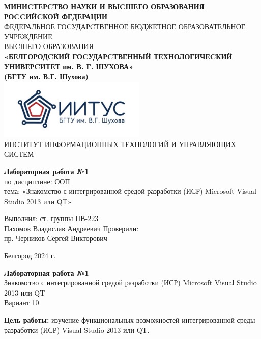 \documentclass[a4paper,14pt]{extarticle}
\newcommand\textbox[1]{
	\parbox{.45\textwidth}{#1}
}
\begin{document}
\begin{center}
    \small{
        \textbf{МИНИCТЕРCТВО НАУКИ И ВЫCШЕГО ОБРАЗОВАНИЯ РОCCИЙCКОЙ ФЕДЕРАЦИИ}\\
        ФЕДЕРАЛЬНОЕ ГОCУДАРCТВЕННОЕ БЮДЖЕТНОЕ ОБРАЗОВАТЕЛЬНОЕ УЧРЕЖДЕНИЕ\\ВЫCШЕГО ОБРАЗОВАНИЯ \\
        \textbf{«БЕЛГОРОДCКИЙ ГОCУДАРCТВЕННЫЙ ТЕХНОЛОГИЧЕCКИЙ\\УНИВЕРCИТЕТ им. В. Г. ШУХОВА»\\ (БГТУ им. В.Г. Шухова)} \\
        \bigbreak
        \includegraphics[width=70mm]{log}\\
        ИНСТИТУТ ИНФОРМАЦИОННЫХ ТЕХНОЛОГИЙ И УПРАВЛЯЮЩИХ СИСТЕМ\\}
\end{center}

\vfill
\begin{center}
    \large{
        \textbf{
            Лабораторная работа №1}}\\
    \normalsize{
        по дисциплине: ООП \\
        тема: «Знакомство с интегрированной средой разработки (ИСР) Microsoft Visual
        Studio 2013 или QT»}
\end{center}
\vfill
\hfill\textbox{
    Выполнил: ст. группы ПВ-223\\Пахомов Владислав Андреевич
    \bigbreak
    Проверили: \\пр. Черников Сергей Викторович
}
\vfill\begin{center}
    Белгород 2024 г.
\end{center}
\newpage
\begin{center}
    \textbf{Лабораторная работа №1}\\
    Знакомство с интегрированной средой разработки (ИСР) Microsoft Visual Studio 2013 или QT\\
    Вариант 10
\end{center}
\textbf{Цель работы: }изучение функциональных возможностей интегрированной
среды разработки (ИСР) Visual Studio 2013 или QT.
\end{document}
